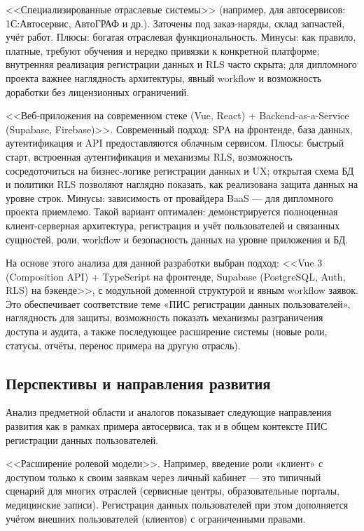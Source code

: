 <<Специализированные отраслевые системы>> (например, для автосервисов: 1С:Автосервис, АвтоГРАФ и др.). Заточены под заказ-наряды, склад запчастей, учёт работ. Плюсы: богатая отраслевая функциональность. Минусы: как правило, платные, требуют обучения и нередко привязки к конкретной платформе; внутренняя реализация регистрации данных и RLS часто скрыта; для дипломного проекта важнее наглядность архитектуры, явный workflow и возможность доработки без лицензионных ограничений.

<<Веб-приложения на современном стеке (Vue, React) + Backend-as-a-Service (Supabase, Firebase)>>. Современный подход: SPA на фронтенде, база данных, аутентификация и API предоставляются облачным сервисом. Плюсы: быстрый старт, встроенная аутентификация и механизмы RLS, возможность сосредоточиться на бизнес-логике регистрации данных и UX; открытая схема БД и политики RLS позволяют наглядно показать, как реализована защита данных на уровне строк. Минусы: зависимость от провайдера BaaS — для дипломного проекта приемлемо. Такой вариант оптимален: демонстрируется полноценная клиент-серверная архитектура, регистрация и учёт пользователей и связанных сущностей, роли, workflow и безопасность данных на уровне приложения и БД.

На основе этого анализа для данной разработки выбран подход: <<Vue 3 (Composition API) + TypeScript на фронтенде, Supabase (PostgreSQL, Auth, RLS) на бэкенде>>, с модульной доменной структурой и явным workflow заявок. Это обеспечивает соответствие теме «ПИС регистрации данных пользователей», наглядность для защиты, возможность показать механизмы разграничения доступа и аудита, а также последующее расширение системы (новые роли, статусы, отчёты, перенос примера на другую отрасль).

\subsection{Перспективы и направления развития}

Анализ предметной области и аналогов показывает следующие направления развития как в рамках примера автосервиса, так и в общем контексте ПИС регистрации данных пользователей.

<<Расширение ролевой модели>>.  Например, введение роли «клиент» с доступом только к своим заявкам через личный кабинет — это типичный сценарий для многих отраслей (сервисные центры, образовательные порталы, медицинские записи). Регистрация данных пользователей при этом дополняется учётом внешних пользователей (клиентов) с ограниченными правами.

